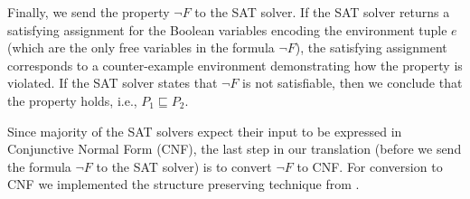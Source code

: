 Finally, we send the property $\neg F$ to the SAT solver. If the SAT solver
returns a satisfying assignment for the Boolean variables
encoding the environment tuple $e$ (which are the only free variables in the
formula $\neg F$), the satisfying assignment corresponds to 
a counter-example environment demonstrating how the property is violated. If the
SAT solver states that $\neg F$  is not satisfiable, then we conclude that
the property holds, i.e., $P_1 \sqsubseteq P_2$.

Since majority of the
SAT solvers expect their input to
be expressed in Conjunctive Normal Form (CNF), 
the last step in our translation (before we send the formula $\neg F$ 
to the SAT solver) is to convert $\neg F$ to CNF.
For conversion to CNF we implemented the structure
preserving technique from \cite{plaisted86structure}.


